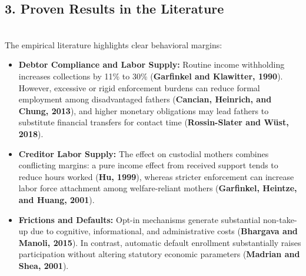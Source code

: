 \documentclass{article}
\begin{document}
\vspace{0.35cm}
\subsection{3. Proven Results in the Literature} \\
The empirical literature highlights clear behavioral margins:
\begin{itemize}
    \setlength\itemsep{0.15em}
    \item \textbf{Debtor Compliance and Labor Supply:} Routine income withholding increases collections by 11\% to 30\% (\textbf{Garfinkel and Klawitter, 1990}). However, excessive or rigid enforcement burdens can reduce formal employment among disadvantaged fathers (\textbf{Cancian, Heinrich, and Chung, 2013}), and higher monetary obligations may lead fathers to substitute financial transfers for contact time (\textbf{Rossin-Slater and Wüst, 2018}).
    \item \textbf{Creditor Labor Supply:} The effect on custodial mothers combines conflicting margins: a pure income effect from received support tends to reduce hours worked (\textbf{Hu, 1999}), whereas stricter enforcement can increase labor force attachment among welfare-reliant mothers (\textbf{Garfinkel, Heintze, and Huang, 2001}).
    \item \textbf{Frictions and Defaults:} Opt-in mechanisms generate substantial non-take-up due to cognitive, informational, and administrative costs (\textbf{Bhargava and Manoli, 2015}). In contrast, automatic default enrollment substantially raises participation without altering statutory economic parameters (\textbf{Madrian and Shea, 2001}).
\end{itemize}

\vspace{0.35cm}
\end{document}
